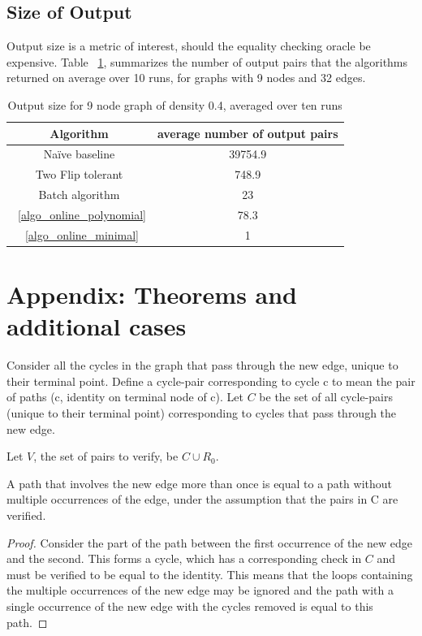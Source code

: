 \documentclass[sigplan,review,anonymous]{acmart}
\begin{document}
{\subsection{Size of Output}
Output size is a metric of interest, should the equality checking oracle be expensive.
Table ~\ref{tab:sizes}, summarizes the number of output pairs that the algorithms returned on average over 10 runs, for graphs with 9 nodes and 32 edges.
\begin{table}
\begin{tabular}{|c|c|}
    \hline
    Algorithm & average number of output pairs \\
    \hline
    Na\"{i}ve baseline & 39754.9 \\
    Two Flip tolerant & 748.9 \\
    Batch algorithm & 23 \\
    ~\ref{algo_online_polynomial} & 78.3 \\
    ~\ref{algo_online_minimal} & 1 \\
    \hline
\end{tabular}
\caption{Output size for 9 node graph of density 0.4, averaged over ten runs}
\label{tab:sizes}
\end{table}

\section{Appendix: Theorems and additional cases}

Consider all the cycles in the graph that pass through the new edge, unique to their terminal point.
Define a cycle-pair corresponding to cycle c to mean the pair of paths (c, identity on terminal node of c).
Let $C$ be the set of all cycle-pairs (unique to their terminal point) corresponding to cycles that pass through the new edge.

Let $V$, the set of pairs to verify, be $C \cup R_0$.

\begin{lemma}
\label{one_occurence_lemma}
A path that involves the new edge more than once is equal to a path without multiple occurrences of the edge, under the assumption that the pairs in C are verified.
\end{lemma}
\begin{proof}
Consider the part of the path between the first occurrence of the new edge and the second. This forms a cycle, which has a corresponding check in $C$ and must be verified to be equal to the identity.
This means that the loops containing the multiple occurrences of the new edge may be ignored and the path with a single occurrence of the new edge with the cycles removed is equal to this path.
\end{proof}

}
\end{document}
